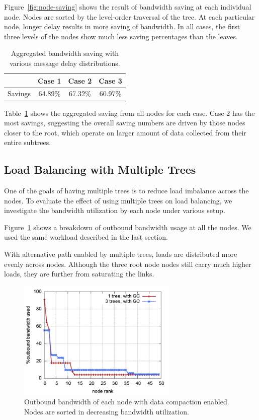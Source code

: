 Figure~\ref{fig:node-saving} shows the result of bandwidth saving at each
individual node.  Nodes are sorted by the level-order traversal of the tree.
At each particular node, longer delay results in more saving of bandwidth.  In
all cases, the first three levels of the nodes show much less saving
percentages than the leaves.

\begin{table}[h]
\begin{center}
\begin{tabular}{|c|c|c|c|}
\hline
 & Case 1 & Case 2 & Case 3 \\ \hline
Savings & 64.89\% & 67.32\% & 60.97\% \\ \hline
\end{tabular}
\end{center}
\caption{\label{tab:saving} Aggregated bandwidth saving with various message
delay distributions.}
\end{table}

Table~\ref{tab:saving} shows the aggregated saving from all nodes for each
case.  Case $2$ has the most savings, suggesting the overall saving numbers are
driven by those nodes closer to the root, which operate on larger amount of
data collected from their entire subtrees.


\subsection{Load Balancing with Multiple Trees}

One of the goals of having multiple trees is to reduce load imbalance across
the nodes.  To evaluate the effect of using multiple trees on load balancing,
we investigate the bandwidth utilization by each node under various setup.

Figure~\ref{fig:bw-gc} shows a breakdown of outbound bandwidth usage at all the
nodes.  We used the same workload described in the last section.

With alternative path enabled by multiple trees, loads are distributed more
evenly across nodes.  Although the three root node nodes still carry much
higher loads, they are further from saturating the links.

\begin{figure}[t]
\begin{center}
\includegraphics[width=3in]{img/bw-gc.png}
\end{center}
\caption{\label{fig:bw-gc} Outbound bandwidth of each node with data compaction
enabled.  Nodes are sorted in decreasing bandwidth utilization.}
\end{figure}

